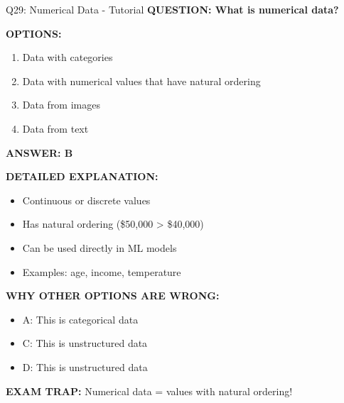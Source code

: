 \documentclass[8pt]{beamer}
\begin{document}
	\begin{frame}{Q29: Numerical Data - Tutorial}
		\fontsize{6.5}{7.5}\selectfont
		\textbf{QUESTION: What is numerical data?}
		
		\vspace{0.1cm}
		\textbf{OPTIONS:}
		\begin{enumerate}
			\item Data with categories
			\item Data with numerical values that have natural ordering
			\item Data from images
			\item Data from text
		\end{enumerate}
		
		\vspace{0.1cm}
		\textcolor{myblue}{\textbf{ANSWER: B}}
		
		\vspace{0.1cm}
		\textbf{DETAILED EXPLANATION:}
		\begin{itemize}
			\item Continuous or discrete values
			\item Has natural ordering (\$50,000 > \$40,000)
			\item Can be used directly in ML models
			\item Examples: age, income, temperature
		\end{itemize}
		
		\vspace{0.1cm}
		\textcolor{myred}{\textbf{WHY OTHER OPTIONS ARE WRONG:}}
		\begin{itemize}
			\item \textcolor{myred}{A:} This is categorical data
			\item \textcolor{myred}{C:} This is unstructured data
			\item \textcolor{myred}{D:} This is unstructured data
		\end{itemize}
		
		\textcolor{myred}{\textbf{EXAM TRAP:}} Numerical data = \textcolor{myblue}{values with natural ordering}!
	\end{frame}
	
\end{document}
